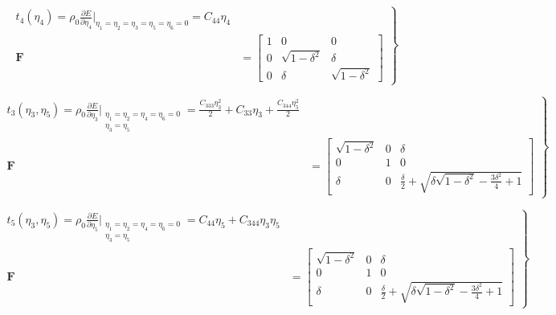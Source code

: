 \documentclass[showpacs,aps,floatfix,prb,reprint,superscriptaddress,onecolumn]{revtex4-1}
\begin{document}
\begin{equation}
\label{eqn:SM-s7}
  \left.\begin{aligned}
        t_{4} \left(\eta_{4}\right) = \rho_{0} \frac{\partial E}{\partial \eta_{4}}\Bigr|_{\eta_1=\eta_2=\eta_3=\eta_5=\eta_6=0} = C_{44}\eta_{4}\\
        \bm{F}&=\begin{bmatrix} 1 & 0 & 0 \\ 0 & \sqrt{1-\delta^2} & \delta \\ 0 & \delta & \sqrt{1-\delta^2} \end{bmatrix}
       \end{aligned}
			\right\}
\end{equation}



\begin{equation}
\label{eqn:SM-s8}
  \left.\begin{aligned}
        t_{3} \left(\eta_{3}, \eta_{5}\right) = \rho_{0} \frac{\partial E}{\partial \eta_{3}}\Bigr|_{\substack{\eta_1=\eta_2=\eta_4=\eta_6=0\\ \eta_{3}=\eta_{5}}} = \frac{C_{333}\eta_{3}^2}{2} + C_{33}\eta_{3} + \frac{C_{344}\eta_{5}^2}{2}\\
        \bm{F}&=\begin{bmatrix} \sqrt{1-\delta^2} & 0 & \delta \\ 0 & 1 & 0 \\ \delta & 0 & \frac{\delta}{2} + \sqrt{\delta \sqrt{1-\delta^2} - \frac{3 \delta^{2}}{4} + 1} \end{bmatrix}
       \end{aligned}
			\right\}
\end{equation}



\begin{equation}
\label{eqn:SM-s9}
  \left.\begin{aligned}
        t_{5} \left(\eta_{3}, \eta_{5}\right) = \rho_{0} \frac{\partial E}{\partial \eta_{5}}\Bigr|_{\substack{\eta_1=\eta_2=\eta_4=\eta_6=0 \\ \eta_3=\eta_5}} = C_{44}\eta_{5} + C_{344}\eta_{3}\eta_{5}\\
        \bm{F}&=\begin{bmatrix} \sqrt{1-\delta^2} & 0 & \delta \\ 0 & 1 & 0 \\ \delta & 0 & \frac{\delta}{2} + \sqrt{\delta \sqrt{1-\delta^2}- \frac{3 \delta^{2}}{4} + 1} \end{bmatrix}
       \end{aligned}
			\right\}
\end{equation}
\end{document}
